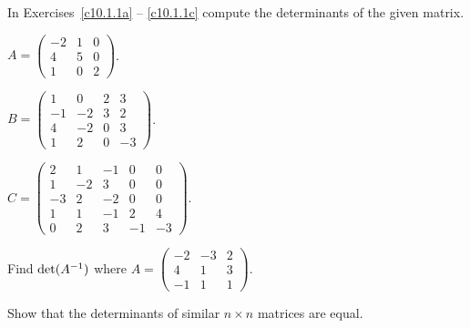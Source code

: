\documentclass{ximera}
\begin{document}
\noindent  In Exercises~\ref{c10.1.1a} -- \ref{c10.1.1c} compute the 
determinants of the given matrix.
\begin{exercise} \label{c10.1.1a}
$A = \left(\begin{array}{rrr} -2 & 1 & 0 \\ 4 & 5& 0 \\ 1 & 0 & 2
\end{array} \right)$.
\end{exercise} 
\begin{exercise} \label{c10.1.1b}
$B = \left(\begin{array}{rrrr} 1 & 0 & 2 & 3 \\ -1 & -2 & 3 & 2
\\ 4 & -2 & 0 & 3 \\ 1 & 2 & 0 & -3 \end{array} \right)$.
\end{exercise}
\begin{exercise} \label{c10.1.1c}
$C = \left(\begin{array}{rrrrr} 2 & 1 & -1 & 0 & 0 \\ 1 & -2 & 3
& 0 & 0 \\ -3 & 2 & -2 & 0 & 0 \\ 1 & 1 & -1 & 2 & 4 \\ 0 & 2 &
3 & -1 & -3 \end{array} \right)$.
\end{exercise}

\begin{exercise} \label{c10.1.2}
Find $\det(A^{-1})$ where 
$A = \left(\begin{array}{rrr} -2 & -3 & 2 \\ 4 & 1 & 3 \\ -1 & 1 & 1
\end{array} \right)$. 
\end{exercise}

\begin{exercise} \label{c10.1.3}
Show that the determinants of similar $n\times n$ matrices are
equal. 
\end{exercise}
\end{document}
